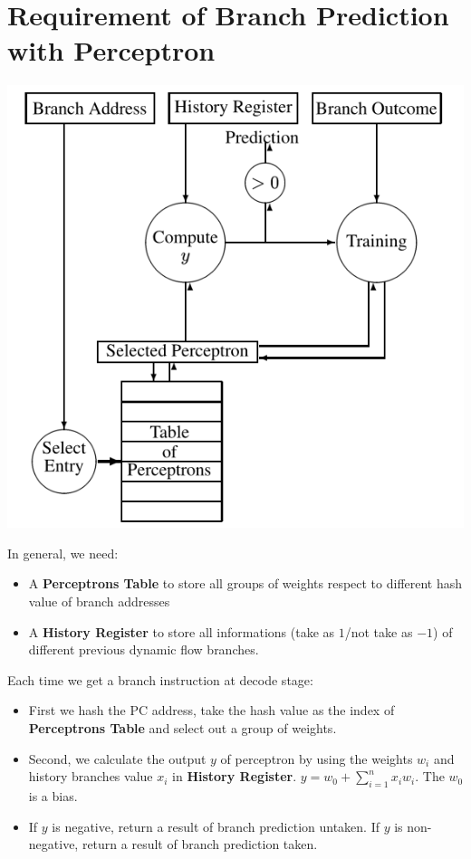 \documentclass{article}
\begin{document}
\section{Requirement of Branch Prediction with Perceptron}
\begin{center}
  \includegraphics[scale = 0.4]{master thought.png}
\end{center}
In general, we need:
\begin{itemize}
  \item A \textbf{Perceptrons Table} to store all groups of weights respect to different hash value of branch addresses
  \item A \textbf{History Register} to store all informations (take as $1$/not take as $-1$) of different previous dynamic flow branches.
\end{itemize} 
Each time we get a branch instruction at decode stage:
\begin{itemize}
  \item First we hash the PC address, take the hash value as the index of \textbf{Perceptrons Table} and select out a group of weights.
  \item Second, we calculate the output $y$ of perceptron by using the weights $w_{i}$ and history branches value $x_{i}$ in \textbf{History Register}. $y=w_{0}+\sum_{i=1}^{n}x_{i}w_{i}$. The $w_{0}$ is a bias.
  \item If $y$ is negative, return a result of branch prediction untaken. If $y$ is non-negative, return a result of branch prediction taken.  
\end{itemize}
\end{document}
